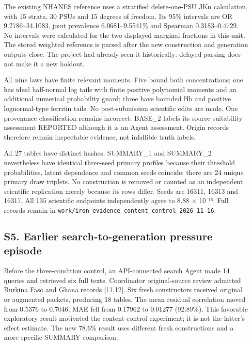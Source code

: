 \documentclass[sigconf,anonymous,nonacm]{acmart}
\begin{document}
The existing NHANES reference uses a stratified delete-one-PSU JKn calculation, with 15 strata, 30 PSUs and 15 degrees of freedom. Its 95\% intervals are OR 9.2786–\allowbreak{}34.1083, joint prevalence 6.0681–\allowbreak{}9.5541\% and Spearman 0.3183–\allowbreak{}0.4729. No intervals were calculated for the two displayed marginal fractions in this unit. The stored weighted reference is parsed after the new construction and generation outputs close. The project had already seen it historically; delayed parsing does not make it a new holdout.


All nine laws have finite relevant moments. Five bound both concentrations; one has ideal half-normal log tails with finite positive polynomial moments and an additional numerical probability guard; three have bounded Hb and positive lognormal-type ferritin tails. No post-submission scientific edits are made. One provenance classification remains incorrect: BASE\_2 labels its source-suitability assessment REPORTED although it is an Agent assessment. Origin records therefore remain inspectable evidence, not infallible truth labels.


All 27 tables have distinct hashes. SUMMARY\_1 and SUMMARY\_2 nevertheless have identical three-seed primary profiles because their threshold probabilities, latent dependence and common seeds coincide; there are 24 unique primary draw triplets. No construction is removed or counted as an independent scientific replication merely because its rows differ. Seeds are 16311, 16313 and 16317. All 135 scientific endpoints independently agree to 8.88 × 10⁻¹⁶. Full records remain in \texttt{work/\allowbreak{}iron\_\allowbreak{}evidence\_\allowbreak{}content\_\allowbreak{}control\_\allowbreak{}2026-\allowbreak{}11-\allowbreak{}16}.



\subsection*{S5. Earlier search-to-generation pressure episode}

Before the three-condition control, an API-connected search Agent made 14 queries and retrieved six full texts. Coordinator original-source review admitted Burkina Faso and Ghana records [11,12]. Six fresh constructors received original or augmented packets, producing 18 tables. The mean residual correlation moved from 0.5376 to 0.7046; MAE fell from 0.17962 to 0.01277 (92.89\%). This favorable exploratory result motivated the content-control experiment; it is not the latter's effect estimate. The new 78.6\% result uses different fresh constructions and a more specific SUMMARY comparison.
\end{document}
